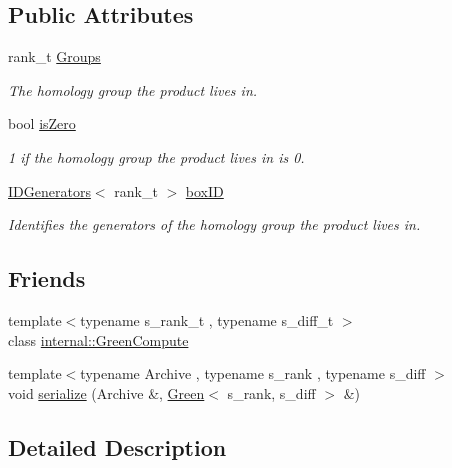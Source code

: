 \subsection*{Public Attributes}
\begin{DoxyCompactItemize}
\item 
rank\+\_\+t \hyperlink{classMackey_1_1Green_acfa5ea708949024bd24f1c1e21399cbc}{Groups}
\begin{DoxyCompactList}\small\item\em The homology group the product lives in. \end{DoxyCompactList}\item 
bool \hyperlink{classMackey_1_1Green_a12a01a6d1715538af0bdc6b34fad6b85}{is\+Zero}
\begin{DoxyCompactList}\small\item\em 1 if the homology group the product lives in is 0. \end{DoxyCompactList}\item 
\hyperlink{classMackey_1_1IDGenerators}{I\+D\+Generators}$<$ rank\+\_\+t $>$ \hyperlink{classMackey_1_1Green_aea166896ebdaa17b3c5d21b2ae936e0d}{box\+ID}
\begin{DoxyCompactList}\small\item\em Identifies the generators of the homology group the product lives in. \end{DoxyCompactList}\end{DoxyCompactItemize}
\subsection*{Friends}
\begin{DoxyCompactItemize}
\item 
{\footnotesize template$<$typename s\+\_\+rank\+\_\+t , typename s\+\_\+diff\+\_\+t $>$ }\\class \hyperlink{classMackey_1_1Green_aa7a5b52d9d87397db413615120f34df7}{internal\+::\+Green\+Compute}
\item 
{\footnotesize template$<$typename Archive , typename s\+\_\+rank , typename s\+\_\+diff $>$ }\\void \hyperlink{classMackey_1_1Green_aeb72946219f32efa8f0a45f5f8872c8a}{serialize} (Archive \&, \hyperlink{classMackey_1_1Green}{Green}$<$ s\+\_\+rank, s\+\_\+diff $>$ \&)
\end{DoxyCompactItemize}


\subsection{Detailed Description}
